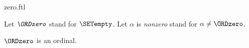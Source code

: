\documentclass{stex}
\begin{document}
\begin{smodule}{zero.ftl}

\begin{convention}[forthel,for=ORDzero]
  Let $\emph{\ORDzero}$ stand for $\SETempty$.
  Let $\alpha$ is \emph{nonzero} stand for $\alpha \neq \ORDzero$.
\end{convention}

\begin{proposition}[forthel]
  $\ORDzero$ is an ordinal.
\end{proposition}
\end{smodule}
\end{document}
